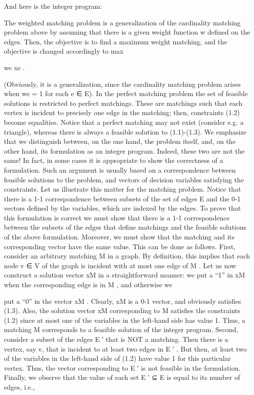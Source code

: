 \documentclass[titlepage]{book}
\begin{document}
And here is the integer program:


The weighted matching problem is a generalization of the cardinality matching problem above by assuming that there is a given weight function w defined on the edges. Then, the objective is to find a
maximum weight matching, and the objective is changed accordingly to max


we xe . 

(Obviously, it is a generalization, since the cardinality matching problem arises when we = 1 for each e ∈ E). In
the perfect matching problem the set of feasible solutions is restricted to perfect matchings. These are
matchings such that each vertex is incident to precisely one edge in the matching; then, constraints (1.2)
become equalities. Notice that a perfect matching may not exist (consider e.g. a triangle), whereas there
is always a feasible solution to (1.1)-(1.3). %
We emphasize that we distinguish between, on the one hand, the problem itself, and, on the other hand,
its formulation as an integer program. Indeed, these two are not the same! In fact, in some cases
it is appropriate to show the correctness of a formulation. Such an argument is usually based on a
correspondence between feasible solutions to the problem, and vectors of decision variables satisfying the
constraints.
Let us illustrate this matter for the matching problem. Notice that there is a 1-1 correspondence between
subsets of the set of edges E and the 0-1 vectors defined by the variables, which are indexed by the edges.
To prove that this formulation is correct we must show that there is a 1-1 correspondence between the
subsets of the edges that define matchings and the feasible solutions of the above formulation. Moreover,
we must show that the matching and its corresponding vector have the same value. This can be done as
follows. First, consider an arbitrary matching M in a graph. By definition, this implies that each node
v ∈ V of the graph is incident with at most one edge of M . Let us now construct a solution vector xM in
a straightforward manner: we put a “1” in xM when the corresponding edge is in M , and otherwise we

put a “0” in the vector xM . Clearly, xM is a 0-1 vector, and obviously satisfies (1.3). Also, the solution
vector xM corresponding to M satisfies the constraints (1.2) since at most one of the variables in the
left-hand side has value 1. Thus, a matching M corresponds to a feasible solution of the integer program.
Second, consider a subset of the edges E ′ that is NOT a matching. Then there is a vertex, say v, that
is incident to at least two edges in E ′ . But then, at least two of the variables in the left-hand side of
(1.2) have value 1 for this particular vertex. Thus, the vector corresponding to E ′ is not feasible in the
formulation. Finally, we observe that the value of each set E ′ ⊆ E is equal to its number of edges, i.e.,
\end{document}
